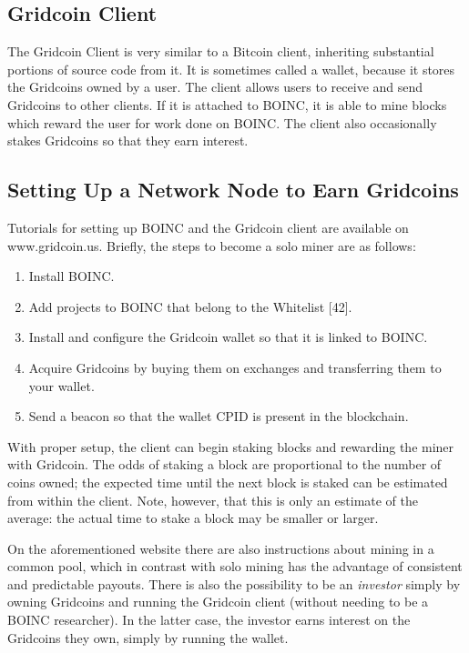 \subsection{Gridcoin Client}

The Gridcoin Client is very similar to a Bitcoin client, inheriting substantial portions of source code from it. It is sometimes called a wallet, because it stores the Gridcoins owned by a user. The client allows users to receive and send Gridcoins to other clients. If it is attached to BOINC, it is able to mine blocks which reward the user for work done on BOINC. The client also occasionally stakes Gridcoins so that they earn interest.

\subsection{Setting Up a Network Node to Earn Gridcoins}

Tutorials for setting up BOINC and the Gridcoin client are available on www.gridcoin.us. Briefly, the steps to become a solo miner are as follows:
\begin{enumerate}
  \item Install BOINC.
  \item Add projects to BOINC that belong to the Whitelist [42].
  \item Install and configure the Gridcoin wallet so that it is linked to BOINC.
  \item Acquire Gridcoins by buying them on exchanges and transferring them to your wallet.
  \item Send a beacon so that the wallet CPID is present in the blockchain.
\end{enumerate}
With proper setup, the client can begin staking blocks and rewarding the miner with Gridcoin. The odds of staking a block are proportional to the number of coins owned; the expected time until the next block is staked can be estimated from within the client. Note, however, that this is only an estimate of the average: the actual time to stake a block may be smaller or larger.

On the aforementioned website there are also instructions about mining in a common pool, which in contrast with solo mining has the advantage of consistent and predictable payouts. There is also the possibility to be an \textit{investor} simply by owning Gridcoins and running the Gridcoin client (without needing to be a BOINC researcher). In the latter case, the investor earns interest on the Gridcoins they own, simply by running the wallet.\\

